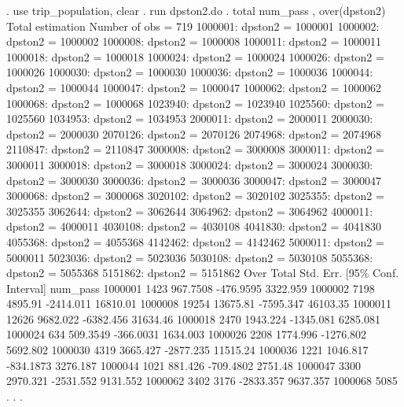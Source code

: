 . use trip_population, clear
{\smallskip}
. run dpston2.do
{\smallskip}
. total num_pass , over(dpston2)
{\smallskip}
Total estimation                  Number of obs   =        719
{\smallskip}
      1000001: dpston2 = 1000001
      1000002: dpston2 = 1000002
      1000008: dpston2 = 1000008
      1000011: dpston2 = 1000011
      1000018: dpston2 = 1000018
      1000024: dpston2 = 1000024
      1000026: dpston2 = 1000026
      1000030: dpston2 = 1000030
      1000036: dpston2 = 1000036
      1000044: dpston2 = 1000044
      1000047: dpston2 = 1000047
      1000062: dpston2 = 1000062
      1000068: dpston2 = 1000068
      1023940: dpston2 = 1023940
      1025560: dpston2 = 1025560
      1034953: dpston2 = 1034953
      2000011: dpston2 = 2000011
      2000030: dpston2 = 2000030
      2070126: dpston2 = 2070126
      2074968: dpston2 = 2074968
      2110847: dpston2 = 2110847
      3000008: dpston2 = 3000008
      3000011: dpston2 = 3000011
      3000018: dpston2 = 3000018
      3000024: dpston2 = 3000024
      3000030: dpston2 = 3000030
      3000036: dpston2 = 3000036
      3000047: dpston2 = 3000047
      3000068: dpston2 = 3000068
      3020102: dpston2 = 3020102
      3025355: dpston2 = 3025355
      3062644: dpston2 = 3062644
      3064962: dpston2 = 3064962
      4000011: dpston2 = 4000011
      4030108: dpston2 = 4030108
      4041830: dpston2 = 4041830
      4055368: dpston2 = 4055368
      4142462: dpston2 = 4142462
      5000011: dpston2 = 5000011
      5023036: dpston2 = 5023036
      5030108: dpston2 = 5030108
      5055368: dpston2 = 5055368
      5151862: dpston2 = 5151862
{\smallskip}
        Over {\VBAR}      Total   Std. Err.     [95\% Conf. Interval]
num_pass     {\VBAR}
     1000001 {\VBAR}       1423   967.7508     -476.9595    3322.959
     1000002 {\VBAR}       7198    4895.91     -2414.011    16810.01
     1000008 {\VBAR}      19254   13675.81     -7595.347    46103.35
     1000011 {\VBAR}      12626   9682.022     -6382.456    31634.46
     1000018 {\VBAR}       2470   1943.224     -1345.081    6285.081
     1000024 {\VBAR}        634   509.3549     -366.0031    1634.003
     1000026 {\VBAR}       2208   1774.996     -1276.802    5692.802
     1000030 {\VBAR}       4319   3665.427     -2877.235    11515.24
     1000036 {\VBAR}       1221   1046.817     -834.1873    3276.187
     1000044 {\VBAR}       1021    881.426     -709.4802     2751.48
     1000047 {\VBAR}       3300   2970.321     -2531.552    9131.552
     1000062 {\VBAR}       3402       3176     -2833.357    9637.357
     1000068 {\VBAR}       5085          .             .           .
